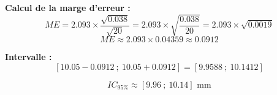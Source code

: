 {\begin{enumerate}
{				\textbf{Calcul de la marge d'erreur :}
				$$ME = 2.093 \times \frac{\sqrt{0.038}}{\sqrt{20}} = 2.093 \times \sqrt{\frac{0.038}{20}} = 2.093 \times \sqrt{0.0019}$$
				$$ME \approx 2.093 \times 0.04359 \approx 0.0912$$
				
				\textbf{Intervalle :}
				$$[10.05 - 0.0912 \ ; \ 10.05 + 0.0912] = [9.9588 \ ; \ 10.1412]$$
				
				$$\boxed{IC_{95\%} \approx [9.96 \ ; \ 10.14] \text{ mm}}$$
			}
		\end{enumerate}
	}
